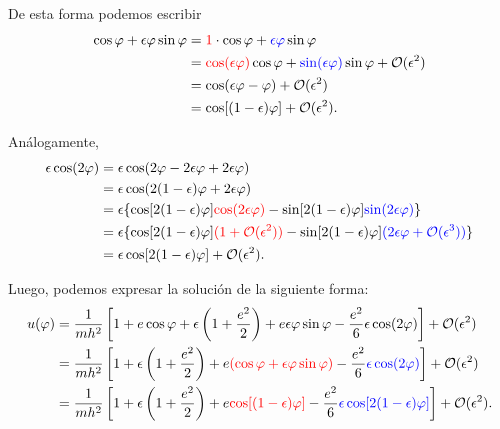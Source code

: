 \documentclass[letterpaper,11pt]{article}
\begin{document}
De esta forma podemos escribir 
\begin{align}
\cos \varphi + \epsilon \varphi \sin\varphi &= \textcolor{red}{1} \cdot \cos \varphi + \textcolor{blue}{\epsilon \varphi} \sin\varphi \nonumber \\
&= \textcolor{red}{\cos(\epsilon \varphi)} \cos \varphi + \textcolor{blue}{\sin(\epsilon \varphi)} \sin\varphi + \mathcal{O}(\epsilon^2)\nonumber \\
&= \cos(\epsilon \varphi - \varphi ) + \mathcal{O}(\epsilon^2)\nonumber \\
&= \cos[(1 - \epsilon)\varphi] + \mathcal{O}(\epsilon^2).
\end{align}

Análogamente,
\begin{align}
\epsilon \cos(2\varphi) &= \epsilon \cos(2\varphi - 2 \epsilon \varphi + 2\epsilon \varphi) \nonumber\\
&=  \epsilon \cos(2 (1 - \epsilon) \varphi + 2 \epsilon \varphi) \nonumber\\
&= \epsilon \{ \cos[2(1 - \epsilon)\varphi] \textcolor{red}{\cos(2\epsilon \varphi)} - \sin [2(1 - \epsilon)\varphi]\textcolor{blue}{\sin(2\epsilon \varphi)}\}\nonumber\\
&= \epsilon \{ \cos[2(1 - \epsilon)\varphi] \textcolor{red}{(1 + \mathcal{O}(\epsilon^2))} - \sin [2(1 - \epsilon)\varphi] \textcolor{blue}{(2\epsilon\varphi + \mathcal{O}(\epsilon^3))}\} \nonumber\\
&= \epsilon \cos[2(1-\epsilon)\varphi] + \mathcal{O}(\epsilon^2).
\end{align}

Luego, podemos expresar la solución \label{eq:sol-u-perturbado-2} de la siguiente forma:
\begin{align}
u(\varphi) &= \frac{1}{mh^2} \left[ 1 + e\cos\varphi + \epsilon \left( 1 + \frac{e^2}{2}\right) + e \epsilon \varphi \sin\varphi - \frac{e^2}{6} \epsilon \cos(2\varphi) \right] + \mathcal{O}(\epsilon^2) \nonumber\\
&= \frac{1}{mh^2} \left[ 1 + \epsilon \left( 1 + \frac{e^2}{2}\right) + e \textcolor{red}{(\cos\varphi +  \epsilon \varphi \sin\varphi)} - \frac{e^2}{6} \textcolor{blue}{\epsilon \cos(2\varphi)} \right] + \mathcal{O}(\epsilon^2) \nonumber\\
&= \frac{1}{mh^2} \left[ 1 + \epsilon \left( 1 + \frac{e^2}{2}\right) + e \textcolor{red}{\cos[(1-\epsilon)\varphi]} - \frac{e^2}{6} \textcolor{blue}{\epsilon \cos[2(1-\epsilon)\varphi]} \right] + \mathcal{O}(\epsilon^2) .
\end{align}
\end{document}
